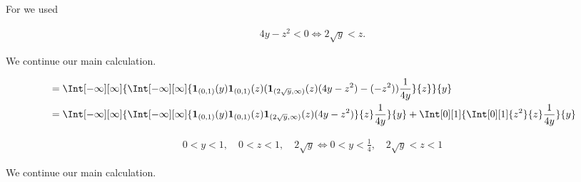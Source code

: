 \begin{solution}
\begin{enumerate}[label = (\alph*)]
    For \Quote{!} we used

    \begin{align*}
        4 y - z^2 < 0
        \iff
        2 \sqrt y < z.
    \end{align*}

    We continue our main calculation.

    \begin{align*}
        & =
        \Int[-\infty][\infty]
        {
            \Int[-\infty][\infty]
            {
                \mathbf 1_{(0, 1)}(y)
                \mathbf 1_{(0, 1)}(z)
                (
                    \mathbf 1_{(2 \sqrt y, \infty)}(z) (4 y - z^2)
                    -
                    (-z^2)
                )
                \frac{1}{4 y}
            }{z}
        }{y} \\
        & =
        \Int[-\infty][\infty]
        {
            \Int[-\infty][\infty]
            {
                \mathbf 1_{(0, 1)}(y)
                \mathbf 1_{(0, 1)}(z)
                \mathbf 1_{(2 \sqrt y, \infty)}(z) (4 y - z^2)
            }{z}
            \frac{1}{4 y}
        }{y}
        +
        \Int[0][1]
        {
            \Int[0][1]
            {
                z^2
            }{z}
            \frac{1}{4 y}
        }{y}
    \end{align*}

    \begin{align*}
        0 < y < 1, \quad 0 < z < 1, \quad 2 \sqrt y
        \iff
        0 < y < \frac{1}{4}, \quad 2 \sqrt y < z < 1
    \end{align*}

    We continue our main calculation.


\end{enumerate}
\end{solution}
